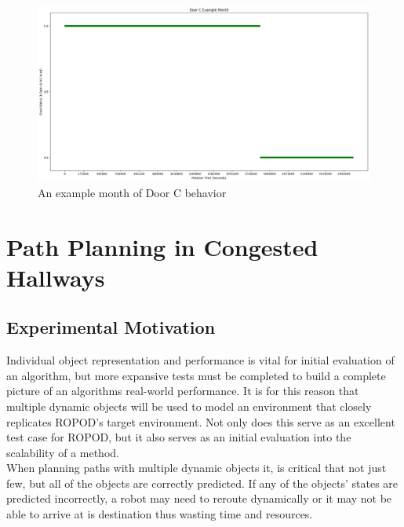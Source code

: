   \begin{figure}[!htb]
    \centering
    \includegraphics[width=\linewidth]{images/Door_C_Example_Month.png}
    \caption{An example month of Door C behavior}
    \label{figure:Door_C_example}
  \end{figure}

  \section{ Path Planning in Congested Hallways}

  \subsection{ Experimental Motivation }

  Individual object representation and performance is vital for initial
  evaluation of an algorithm, but more expansive tests must be completed to
  build a complete picture of an algorithms real-world performance. It is for
  this reason that multiple dynamic objects will be used to model an environment
  that closely replicates ROPOD's target environment. Not only does this
  serve as an excellent test case for ROPOD, but it also serves as an initial
  evaluation into the scalability of a method. \\

  When planning paths with multiple dynamic objects it, is critical that not just
  few, but all of the objects are correctly predicted. If any of the objects' states are
  predicted incorrectly, a robot may need to reroute dynamically or it may not
  be able to arrive at is destination thus wasting time and resources. \\


